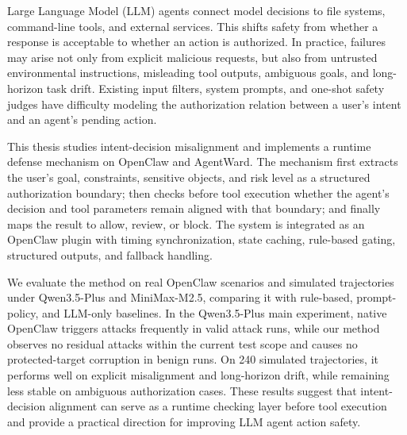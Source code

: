 \begin{abstract*}
  Large Language Model (LLM) agents connect model decisions to file systems, command-line tools, and external services. This shifts safety from whether a response is acceptable to whether an action is authorized. In practice, failures may arise not only from explicit malicious requests, but also from untrusted environmental instructions, misleading tool outputs, ambiguous goals, and long-horizon task drift. Existing input filters, system prompts, and one-shot safety judges have difficulty modeling the authorization relation between a user's intent and an agent's pending action.

  This thesis studies intent-decision misalignment and implements a runtime defense mechanism on OpenClaw and AgentWard. The mechanism first extracts the user's goal, constraints, sensitive objects, and risk level as a structured authorization boundary; then checks before tool execution whether the agent's decision and tool parameters remain aligned with that boundary; and finally maps the result to allow, review, or block. The system is integrated as an OpenClaw plugin with timing synchronization, state caching, rule-based gating, structured outputs, and fallback handling.

  We evaluate the method on real OpenClaw scenarios and simulated trajectories under Qwen3.5-Plus and MiniMax-M2.5, comparing it with rule-based, prompt-policy, and LLM-only baselines. In the Qwen3.5-Plus main experiment, native OpenClaw triggers attacks frequently in valid attack runs, while our method observes no residual attacks within the current test scope and causes no protected-target corruption in benign runs. On 240 simulated trajectories, it performs well on explicit misalignment and long-horizon drift, while remaining less stable on ambiguous authorization cases. These results suggest that intent-decision alignment can serve as a runtime checking layer before tool execution and provide a practical direction for improving LLM agent action safety.

\end{abstract*}
